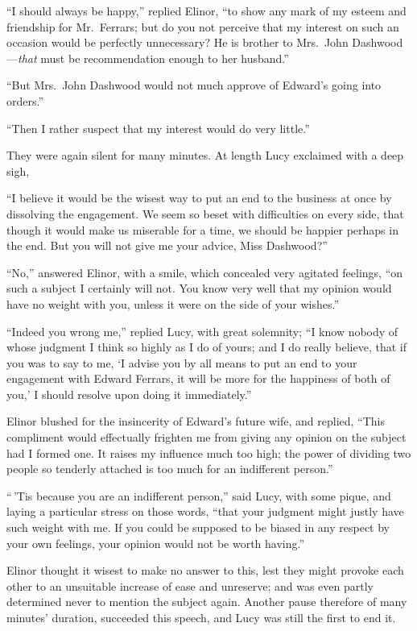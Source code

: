 ``I should always be happy,'' replied Elinor, ``to show
any mark of my esteem and friendship for Mr.\ Ferrars;
but do you not perceive that my interest on such an
occasion would be perfectly unnecessary?  He is brother
to Mrs.\ John Dashwood---\emph{that} must be recommendation enough
to her husband.''

``But Mrs.\ John Dashwood would not much approve
of Edward's going into orders.''

``Then I rather suspect that my interest would
do very little.''

They were again silent for many minutes.  At length
Lucy exclaimed with a deep sigh,

``I believe it would be the wisest way to put an end
to the business at once by dissolving the engagement.
We seem so beset with difficulties on every side,
that though it would make us miserable for a time,
we should be happier perhaps in the end.  But you will
not give me your advice, Miss Dashwood?''

``No,'' answered Elinor, with a smile, which concealed
very agitated feelings, ``on such a subject I certainly
will not.  You know very well that my opinion would have
no weight with you, unless it were on the side of your wishes.''

``Indeed you wrong me,'' replied Lucy, with great
solemnity; ``I know nobody of whose judgment I think
so highly as I do of yours; and I do really believe,
that if you was to say to me, `I advise you by all means
to put an end to your engagement with Edward Ferrars,
it will be more for the happiness of both of you,'
I should resolve upon doing it immediately.''

Elinor blushed for the insincerity of Edward's
future wife, and replied, ``This compliment would effectually
frighten me from giving any opinion on the subject
had I formed one.  It raises my influence much too high;
the power of dividing two people so tenderly attached
is too much for an indifferent person.''

``\,'Tis because you are an indifferent person,'' said Lucy,
with some pique, and laying a particular stress on those words,
``that your judgment might justly have such weight with me.
If you could be supposed to be biased in any respect
by your own feelings, your opinion would not be worth having.''

Elinor thought it wisest to make no answer to this,
lest they might provoke each other to an unsuitable increase
of ease and unreserve; and was even partly determined
never to mention the subject again.  Another pause
therefore of many minutes' duration, succeeded this speech,
and Lucy was still the first to end it.

